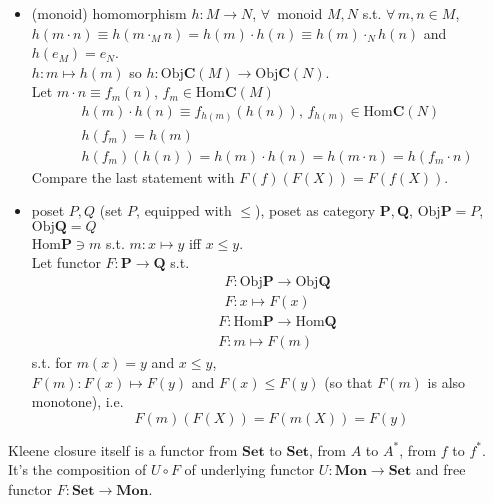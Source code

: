 \documentclass[10pt]{amsart}
\begin{document}
\begin{multicols*}{2}
\begin{itemize}
	\item (monoid) homomorphism $h: M \to N$, $\forall \, $ monoid $M, N$ s.t. $\forall \, m,n \in M$, \\
	$h(m\cdot n) \equiv h(m\cdot_M n) = h(m) \cdot h(n) \equiv h(m) \cdot_N h(n)$ and \\
	$h(e_M) = e_N$. \\
	
	$h:m \mapsto h(m)$ so $h: \text{Obj}\mathbf{C}(M) \to \text{Obj}\mathbf{C}(N)$. \\
	Let $m\cdot n \equiv f_m(n)$, $f_m \in \text{Hom}\mathbf{C}(M)$
	\[
	\begin{aligned}
		& h(m) \cdot h(n) \equiv f_{h(m)}(h(n)), \, f_{h(m)} \in \text{Hom}\mathbf{C}(N) \\
 		& h(f_m) = h(m) \\
		& h(f_m)(h(n)) = h(m)\cdot h(n) = h(m\cdot n) = h(f_m\cdot n)
	\end{aligned}
	\]
	Compare the last statement with $F(f)(F(X)) = F(f(X))$.
	\item poset $P, Q$ (set $P$, equipped with $\leq$), poset as category $\mathbf{P}, \mathbf{Q}$, $\text{Obj}\mathbf{P} = P$, $\text{Obj}\mathbf{Q} = Q$ \\
	$\text{Hom}\mathbf{P} \ni m$ s.t. $m:x \mapsto y$ iff $x\leq y$. \\
	
	Let functor $F: \mathbf{P} \to \mathbf{Q}$ s.t. 
	\[
	\begin{aligned} 
		& F: \text{Obj}\mathbf{P} \to \text{Obj}\mathbf{Q} \\  
		&	F: x \mapsto F(x)
	\end{aligned} 
	\]
	\[
	\begin{aligned}
		& F: \text{Hom}\mathbf{P} \to \text{Hom}\mathbf{Q} \\ 
		& F: m \mapsto F(m)
	\end{aligned}
	\]
	s.t. for $m(x) =y$ and $x\leq y$, \\
	$F(m): F(x) \mapsto F(y)$ and $F(x) \leq F(y)$ (so that $F(m)$ is also monotone), i.e.
	\[
	F(m)(F(X)) = F(m(X)) = F(y)
	\]
\end{itemize}

Kleene closure itself is a functor from $\mathbf{Set}$ to $\textbf{Set}$, from $A$ to $A^*$, from $f$ to $f^*$. \\
It's the composition of $U\circ F$ of underlying functor $U:\textbf{Mon} \to \textbf{Set}$ and free functor $F:\textbf{Set} \to \textbf{Mon}$. 


\end{multicols*}
\end{document}
